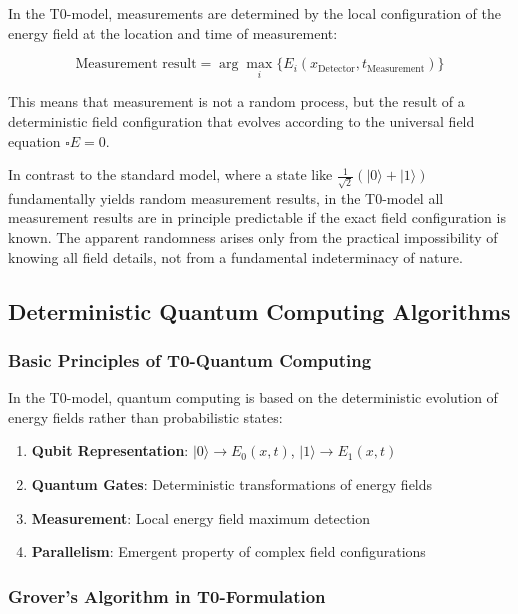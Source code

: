 \documentclass[12pt,a4paper]{article}
\theoremstyle{definition}
\begin{document}
	In the T0-model, measurements are determined by the local configuration of the energy field at the location and time of measurement:
	
	\begin{equation}
		\text{Measurement result} = \arg\max_i\{E_i(x_{\text{Detector}}, t_{\text{Measurement}})\}
	\end{equation}
	
	This means that measurement is not a random process, but the result of a deterministic field configuration that evolves according to the universal field equation $\square E = 0$.
	
	\begin{wichtig}
		In contrast to the standard model, where a state like $\frac{1}{\sqrt{2}}(|0\rangle + |1\rangle)$ fundamentally yields random measurement results, in the T0-model all measurement results are in principle predictable if the exact field configuration is known. The apparent randomness arises only from the practical impossibility of knowing all field details, not from a fundamental indeterminacy of nature.
	\end{wichtig}
	
	\subsection{Deterministic Quantum Computing Algorithms}
	
	\subsubsection{Basic Principles of T0-Quantum Computing}
	
	In the T0-model, quantum computing is based on the deterministic evolution of energy fields rather than probabilistic states:
	
	\begin{enumerate}
		\item \textbf{Qubit Representation}: $|0\rangle \rightarrow E_0(x,t)$, $|1\rangle \rightarrow E_1(x,t)$
		\item \textbf{Quantum Gates}: Deterministic transformations of energy fields
		\item \textbf{Measurement}: Local energy field maximum detection
		\item \textbf{Parallelism}: Emergent property of complex field configurations
	\end{enumerate}
	
	\subsubsection{Grover's Algorithm in T0-Formulation}
	
\end{document}
